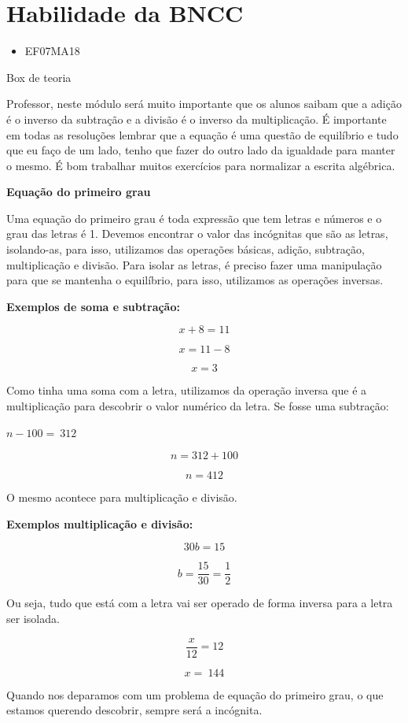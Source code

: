 \section{Habilidade da BNCC }
\begin{itemize}
\item EF07MA18
\end{itemize}

Box de teoria

Professor, neste módulo será muito importante que os alunos saibam que a
adição é o inverso da subtração e a divisão é o inverso da
multiplicação. É importante em todas as resoluções lembrar que a equação
é uma questão de equilíbrio e tudo que eu faço de um lado, tenho que
fazer do outro lado da igualdade para manter o mesmo. É bom trabalhar
muitos exercícios para normalizar a escrita algébrica.

\textbf{Equação do primeiro grau}

Uma equação do primeiro grau é toda expressão que tem letras e números e
o grau das letras é 1. Devemos encontrar o valor das incógnitas que são
as letras, isolando-as, para isso, utilizamos das operações básicas,
adição, subtração, multiplicação e divisão. Para isolar as letras, é
preciso fazer uma manipulação para que se mantenha o equilíbrio, para
isso, utilizamos as operações inversas.

\textbf{Exemplos de soma e subtração:}

$$x + 8 = 11$$

$$x = 11 - 8$$

$$x = 3$$

Como tinha uma soma com a letra, utilizamos da operação inversa que é a
multiplicação para descobrir o valor numérico da letra. Se fosse uma
subtração:

$n - 100 = \ 312$

$$n = 312 + 100$$

$$n = 412$$

O mesmo acontece para multiplicação e divisão.

\textbf{Exemplos multiplicação e divisão:}

$$30b = 15$$

$$b = \frac{15}{30} = \frac{1}{2}$$

Ou seja, tudo que está com a letra vai ser operado de forma inversa para
a letra ser isolada.

$$\frac{x}{12} = 12$$

$$x = \ 144$$

Quando nos deparamos com um problema de equação do primeiro grau, o que
estamos querendo descobrir, sempre será a incógnita.

